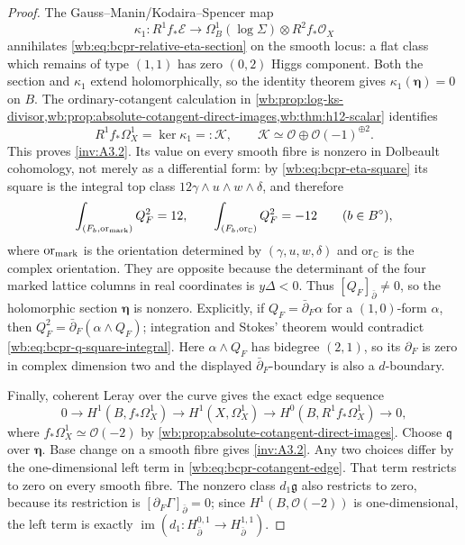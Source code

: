 \begin{proof}
The Gauss--Manin/Kodaira--Spencer map
\[
 \kappa_1\colon R^1f_*\mathcal E\longrightarrow
 \Omega_B^1(\log\Sigma)\otimes R^2f_*\mathcal O_X
\]
annihilates \cref{wb:eq:bcpr-relative-eta-section} on the smooth locus: a
flat class which remains of type $(1,1)$ has zero $(0,2)$ Higgs component.
Both the section and $\kappa_1$ extend holomorphically, so the identity
theorem gives $\kappa_1(\boldsymbol\eta)=0$ on $B$.  The ordinary-cotangent
calculation in
\cref{wb:prop:log-ks-divisor,wb:prop:absolute-cotangent-direct-images,wb:thm:h12-scalar}
identifies
\begin{equation}
 R^1f_*\Omega_X^1=\ker\kappa_1=:\mathcal K,
 \qquad
 \mathcal K\simeq\mathcal O\oplus\mathcal O(-1)^{\oplus2}.
\label{wb:eq:bcpr-cotangent-kernel}
\end{equation}
This proves \cref{inv:A3.2}.  Its value on every smooth
fibre is nonzero in Dolbeault cohomology, not merely as a differential form:
by \cref{wb:eq:bcpr-eta-square} its square is the integral top class
$12\gamma\wedge u\wedge w\wedge\delta$, and therefore
\begin{equation}
 \int_{(F_b,\mathrm{or}_{\rm mark})}Q_F^2=12,
 \qquad
 \int_{(F_b,\mathrm{or}_{\mathbb C})}Q_F^2=-12
\qquad(b\in B^\circ),
\label{wb:eq:bcpr-q-square-integral}
\end{equation}
where $\mathrm{or}_{\rm mark}$ is the orientation determined by
$(\gamma,u,w,\delta)$ and $\mathrm{or}_{\mathbb C}$ is the complex
orientation.  They are opposite because the determinant of the four marked
lattice columns in real coordinates is $y\Delta<0$.  Thus
$[Q_F]_{\bar\partial}\ne0$, so the holomorphic
section $\boldsymbol\eta$ is nonzero.  Explicitly, if
$Q_F=\bar\partial_F\alpha$ for a $(1,0)$-form $\alpha$, then
$Q_F^2=\bar\partial_F(\alpha\wedge Q_F)$; integration and Stokes' theorem
would contradict \cref{wb:eq:bcpr-q-square-integral}.  Here
$\alpha\wedge Q_F$ has bidegree $(2,1)$, so its $\partial_F$ is zero in
complex dimension two and the displayed $\bar\partial_F$-boundary is also a
$d$-boundary.

Finally, coherent Leray over the curve gives the exact edge sequence
\begin{equation}
 0\longrightarrow H^1(B,f_*\Omega_X^1)
 \longrightarrow H^1(X,\Omega_X^1)
 \longrightarrow H^0(B,R^1f_*\Omega_X^1)
 \longrightarrow0,
\label{wb:eq:bcpr-cotangent-edge}
\end{equation}
where $f_*\Omega_X^1\simeq\mathcal O(-2)$ by
\cref{wb:prop:absolute-cotangent-direct-images}.  Choose $\mathfrak q$ over
$\boldsymbol\eta$.  Base change on a smooth fibre gives
\cref{inv:A3.2}.  Any two choices differ by the
one-dimensional left term in \cref{wb:eq:bcpr-cotangent-edge}.  That term
restricts to zero on every smooth fibre.  The nonzero class
$d_1\mathfrak g$ also restricts to zero, because its restriction is
$[\partial_F\Gamma]_{\bar\partial}=0$; since
$H^1(B,\mathcal O(-2))$ is one-dimensional, the left term is exactly
$\operatorname{im}(d_1\colon H^{0,1}_{\bar\partial}\to
H^{1,1}_{\bar\partial})$.
\end{proof}

